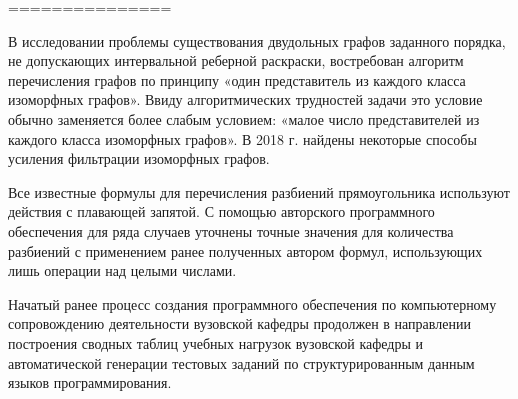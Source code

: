 %
%
%






===============

В исследовании проблемы существования двудольных графов заданного порядка, не допускающих интервальной реберной раскраски, востребован алгоритм перечисления графов по принципу «один представитель из каждого класса изоморфных графов». Ввиду алгоритмических трудностей задачи это условие обычно заменяется более слабым условием: «малое число представителей из каждого класса изоморфных графов». В 2018 г. найдены некоторые способы усиления фильтрации изоморфных графов.


Все известные формулы для перечисления разбиений прямоугольника используют действия с плавающей запятой. С помощью авторского программного обеспечения для ряда случаев уточнены точные значения для количества разбиений с применением ранее полученных автором формул, использующих лишь операции над целыми числами.


Начатый ранее процесс создания программного обеспечения по компьютерному сопровождению деятельности вузовской кафедры продолжен в направлении построения сводных таблиц учебных нагрузок вузовской кафедры и автоматической генерации тестовых заданий по структурированным данным языков программирования.



